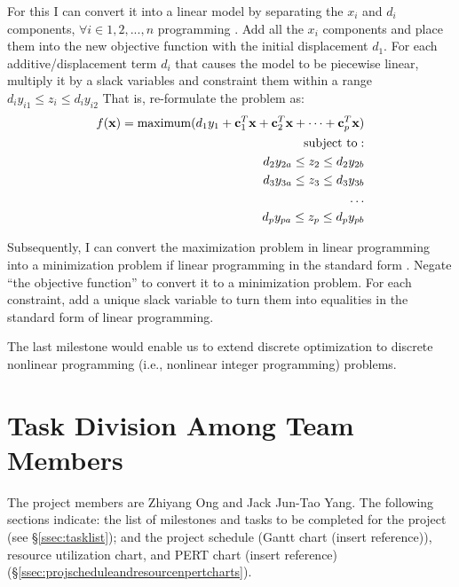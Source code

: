 \documentclass[letter,12pt]{article}
\begin{document}
For this I can convert it into a linear model by separating the $x_{i}$ and $d_{i}$ components, $\forall i \in {1, 2, ..., n}$
programming \cite[\S3.3, pages 83--86]{Haftka1992}\cite[\S1, pages 5-8]{Malucelli2005}. Add all the $x_{i}$ components and place them into the new objective function with the initial displacement $d_{1}$. For each additive/displacement term $d_{i}$ that causes the model to be piecewise linear, multiply it by a slack variables and constraint them within a range $d_{i}y_{i1} \leq z_{i} \leq d_{i}y_{i2}$ That is, re-formulate the problem as:
\begin{eqnarray*}
f({\mathbf{x}}) = {\rm maximum} (d_{1}y_{1} + \mathbf{c}^{T}_{1}\mathbf{x} + \mathbf{c}^{T}_{2}\mathbf{x} + \dots + \mathbf{c}^{T}_{p}\mathbf{x}) \\
{\rm subject\ to:} \\
d_{2}y_{2a} \leq z_{2} \leq d_{2}y_{2b} \\
d_{3}y_{3a} \leq z_{3} \leq d_{3}y_{3b} \\
\dots \\
d_{p}y_{pa} \leq z_{p} \leq d_{p}y_{pb} \\
\end{eqnarray*}


Subsequently, I can convert the maximization problem in linear programming into a minimization problem if linear programming in the standard form \cite[\S3.4, page 48, Example 1]{Luenberger2008}. Negate ``the objective function'' to convert it to a minimization problem. For each constraint, add a unique slack variable to turn them into equalities in the standard form of linear programming.



The last milestone would enable us to extend discrete optimization to discrete nonlinear programming (i.e., nonlinear integer programming) problems.





\section{Task Division Among Team Members}
\label{sec:taskdiv}

The project members are Zhiyang Ong and Jack Jun-Tao Yang. The following sections indicate: the list of milestones and tasks to be completed for the project (see \S\ref{ssec:tasklist}); and the project schedule (Gantt chart (insert reference)), resource utilization chart, and PERT chart (insert reference) (\S\ref{ssec:projscheduleandresourcenpertcharts}).
\end{document}
